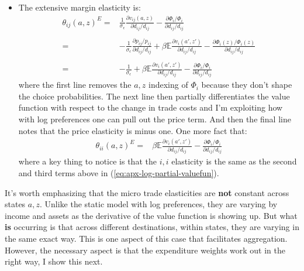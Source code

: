 \documentclass[12pt,pdftex]{article}
\begin{document}
\begin{onehalfspacing}
\begin{itemize}
\item The extensive margin elasticity is:
\begin{align}
\theta_{ij}(a,z)^E =& \frac{1}{\sigma_{\epsilon}}\frac{\partial v_{ij}(a,z)}{\partial d_{ij}/d_{ij}} -  \frac{\partial \Phi_{i} / \Phi_{i}}{\partial d_{ij}/d_{ij}}\\
\nonumber \\
=& -\frac{1}{\sigma_{\epsilon}}\frac{\partial p_{ij} / p_{ij}}{\partial d_{ij}/d_{ij}} + \beta \mathbb{E} \frac{\partial v_{i}(a',z')}{\partial d_{ij}/d_{ij}} -  \frac{\partial \Phi_{i}(z) / \Phi_{i}(z)}{\partial d_{ij}/d_{ij}} \\
\nonumber \\
=& -\frac{1}{\sigma_{\epsilon}} + \beta \mathbb{E} \frac{\partial v_{i}(a',z')}{\partial d_{ij}/d_{ij}} -  \frac{\partial \Phi_{i} / \Phi_{i}}{\partial d_{ij}/d_{ij}}
\label{eq:apx-log-partial-valuefun}
\end{align}
where the first line removes the $a,z$ indexing of $\Phi_i$ because they don't shape the choice probabilities. The next line then partially differentiates the value function with respect to the change in trade costs and I'm exploiting how with log preferences one can pull out the price term. And then the final line notes that the price elasticity is minus one. One more fact that:
\begin{align}
\theta_{ii}(a,z)^E =&  \beta \mathbb{E} \frac{\partial v_{i}(a',z')}{\partial d_{ij}/d_{ij}} -  \frac{\partial \Phi_{i} / \Phi_{i}}{\partial d_{ij}/d_{ij}}
\end{align}
where a key thing to notice is that the $i,i$ elasticity is the same as the second and third terms above in (\ref{eq:apx-log-partial-valuefun}).
\end{itemize}
It's worth emphasizing that the micro trade elasticities are \textbf{not} constant across states $a,z$. Unlike the static model with log preferences, they are varying by income and assets as the derivative of the value function is showing up. But what \textbf{is} occurring is that across different destinations, within states, they are varying in the same exact way. This is one aspect of this case that facilitates aggregation. However, the necessary aspect is that the expenditure weights work out in the right way, I show this next.


\end{onehalfspacing}
\end{document}
